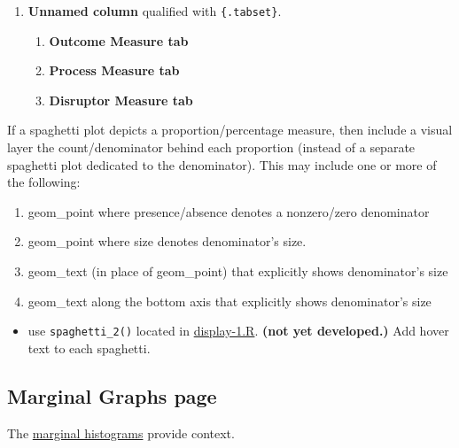 \documentclass[
]{book}
\providecommand{\tightlist}{%
  \setlength{\itemsep}{0pt}\setlength{\parskip}{0pt}}
\begin{document}
\begin{enumerate}
\def\labelenumi{\arabic{enumi}.}
\item
  \textbf{Unnamed column} qualified with \texttt{\{.tabset\}}.

  \begin{enumerate}
  \def\labelenumii{\arabic{enumii}.}
  \tightlist
  \item
    \textbf{Outcome Measure tab}
  \item
    \textbf{Process Measure tab}
  \item
    \textbf{Disruptor Measure tab}
  \end{enumerate}
\end{enumerate}

If a spaghetti plot depicts a proportion/percentage measure, then include a visual layer the count/denominator behind each proportion (instead of a separate spaghetti plot dedicated to the denominator). This may include one or more of the following:

\begin{enumerate}
\def\labelenumi{\arabic{enumi}.}
\tightlist
\item
  geom\_point where presence/absence denotes a nonzero/zero denominator
\item
  geom\_point where size denotes denominator's size.
\item
  geom\_text (in place of geom\_point) that explicitly shows denominator's size
\item
  geom\_text along the bottom axis that explicitly shows denominator's size
\end{enumerate}

\begin{itemize}
\tightlist
\item
  use \texttt{spaghetti\_2()} located in \href{https://github.com/OuhscBbmc/miechv-3/blob/master/analysis/common/display-1.R}{display-1.R}. \textbf{(not yet developed.)} Add hover text to each spaghetti.
\end{itemize}

\hypertarget{marginal-graphs-page}{%
\subsection{Marginal Graphs page}\label{marginal-graphs-page}}

The \href{https://ouhscbbmc.github.io/data-science-practices-1/dashboard-1.html\#marginals}{marginal histograms} provide context.
\end{document}
